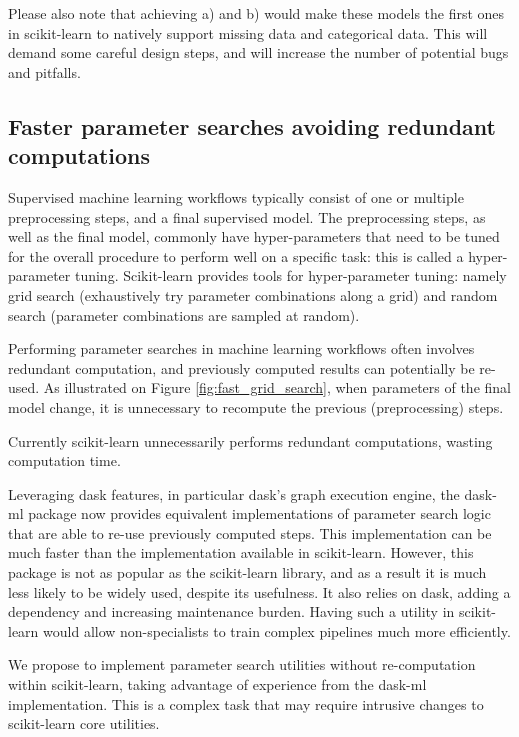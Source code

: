 \documentclass[11pt]{article}  %
\begin{document}
Please also note that achieving a) and b) would make these models the
first ones in scikit-learn to natively support missing data and
categorical data. This will demand some careful design steps, and will increase the number of potential bugs and pitfalls.


\subsection{Faster parameter searches avoiding redundant computations}

Supervised machine learning workflows typically consist of one or multiple
preprocessing steps, and a final supervised model. The preprocessing steps, as well as the final model, commonly have hyper-parameters that need to be tuned
for the overall procedure to perform well on a specific task: this is called a
hyper-parameter tuning. Scikit-learn provides tools for hyper-parameter tuning: namely grid search (exhaustively try parameter combinations along a grid) and
random search (parameter combinations are sampled at random).

Performing parameter searches in machine learning workflows often involves
redundant computation, and previously computed results can potentially be
re-used. As illustrated on Figure \ref{fig:fast_grid_search}, when parameters of
the final model change, it is unnecessary to recompute the previous
(preprocessing) steps.

Currently scikit-learn unnecessarily performs redundant computations, wasting
computation time.

Leveraging dask features, in particular dask’s graph execution engine, the
dask-ml package now provides equivalent implementations of
parameter search logic that are able to re-use previously computed steps.
This implementation can be much faster than the implementation available in
scikit-learn. However, this package is not as popular as the scikit-learn
library, and as a result it is much less likely to be widely used, despite
its usefulness. It also relies on dask, adding a dependency and increasing
maintenance burden. Having such a utility in scikit-learn would allow
non-specialists to train complex pipelines much more efficiently.

We propose to implement parameter search utilities without re-computation
within scikit-learn, taking advantage of experience from the dask-ml
implementation. This is a complex task that may require intrusive changes to
scikit-learn core utilities.
\end{document}
